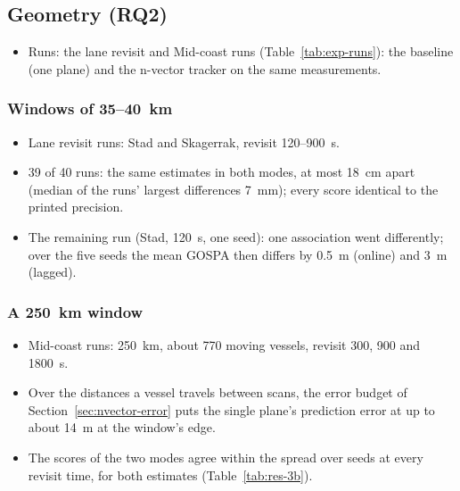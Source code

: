 \subsection{Geometry (RQ2)}
\label{sec:res-geometry}

\begin{itemize}
    \item Runs: the lane revisit and Mid-coast runs (Table~\ref{tab:exp-runs}): the baseline (one plane) and the n-vector tracker on the same measurements.
\end{itemize}

\subsubsection{Windows of 35--40~km}

\begin{itemize}
    \item Lane revisit runs: Stad and Skagerrak, revisit 120--900~s.
    \item 39 of 40 runs: the same estimates in both modes, at most 18~cm apart (median of the runs' largest differences 7~mm); every score identical to the printed precision.
    \item The remaining run (Stad, 120~s, one seed): one association went differently; over the five seeds the mean GOSPA then differs by 0.5~m (online) and 3~m (lagged).
\end{itemize}

\subsubsection{A 250~km window}

\begin{itemize}
    \item Mid-coast runs: 250~km, about 770 moving vessels, revisit 300, 900 and 1800~s.
    \item Over the distances a vessel travels between scans, the error budget of Section~\ref{sec:nvector-error} puts the single plane's prediction error at up to about 14~m at the window's edge.
    \item The scores of the two modes agree within the spread over seeds at every revisit time, for both estimates (Table~\ref{tab:res-3b}).
\end{itemize}

